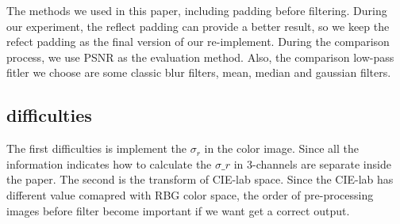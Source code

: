 \documentclass[12pt]{article}
\begin{document}
The methods we used in this paper, including padding before filtering. 
During our experiment, the reflect padding can provide a better result, so we keep the refect padding as the final version of our re-implement.
During the comparison process, we use PSNR as the evaluation method.
Also, the comparison low-pass fitler we choose are some classic blur filters, mean, median and gaussian filters.

\subsection{difficulties}

The first difficulties is implement the $\sigma_r$ in the color image. 
Since all the information indicates how to calculate the $\sigma\_r$ in 3-channels are separate inside the paper.
The second is the transform of CIE-lab space.
Since the CIE-lab has different value comapred with RBG color space, the order of pre-processing images before filter become important if we want get a correct output.
\end{document}
